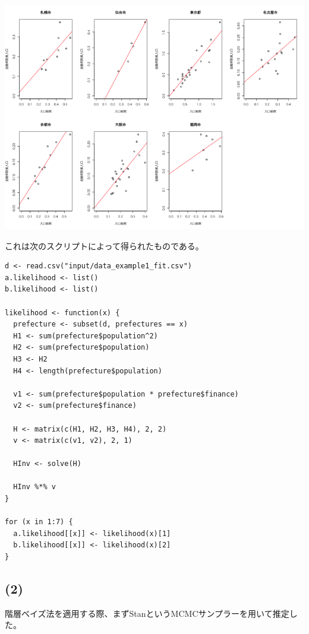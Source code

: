 \documentclass[a4j,xelatex,ja=standard,jafont=hiragino-pron, 9pt]{bxjsarticle}
\let\origfigure=\figure
\let\endorigfigure=\endfigure
\renewenvironment{figure}[1][]{%
  \origfigure[H]
}{%
  \endorigfigure
}
\begin{document}
\begin{figure}
\centering
\includegraphics[width=14cm]{../src/output/image/regression.png}
\caption{最尤推定法による推定}
\end{figure}

これは次のスクリプトによって得られたものである。

\begin{lstlisting}
d <- read.csv("input/data_example1_fit.csv")
a.likelihood <- list()
b.likelihood <- list()

likelihood <- function(x) {
  prefecture <- subset(d, prefectures == x)
  H1 <- sum(prefecture$population^2)
  H2 <- sum(prefecture$population)
  H3 <- H2
  H4 <- length(prefecture$population)

  v1 <- sum(prefecture$population * prefecture$finance)
  v2 <- sum(prefecture$finance)

  H <- matrix(c(H1, H2, H3, H4), 2, 2)
  v <- matrix(c(v1, v2), 2, 1)

  HInv <- solve(H)

  HInv %*% v
}

for (x in 1:7) {
  a.likelihood[[x]] <- likelihood(x)[1]
  b.likelihood[[x]] <- likelihood(x)[2]
}
\end{lstlisting}

\subsection*{(2)}

階層ベイズ法を適用する際、まずStanというMCMCサンプラーを用いて推定した。
\end{document}

